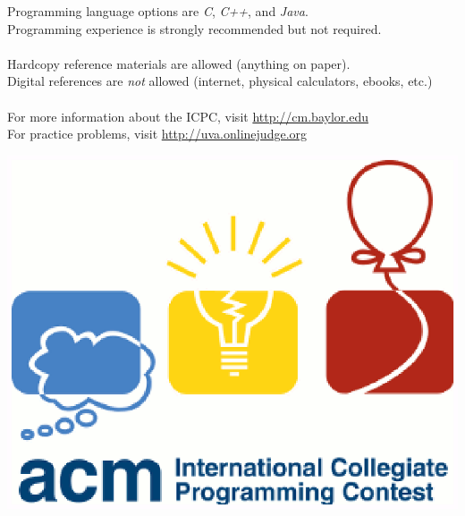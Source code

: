 \documentclass{article}
\begin{document}
Programming language options are \emph{C}, \emph{C++}, and \emph{Java}.\\
Programming experience is strongly recommended but not required.\\
\\
Hardcopy reference materials are allowed (anything on paper).\\
Digital references are \emph{not} allowed (internet, physical calculators, ebooks, etc.)\\
\\
For more information about the ICPC, visit \url{http://cm.baylor.edu}\\
For practice problems, visit \url{http://uva.onlinejudge.org}


\vspace{-15mm}
\begin{center}
\includegraphics[scale=0.6]{icpc_logo.eps}
\end{center}
\end{document}
